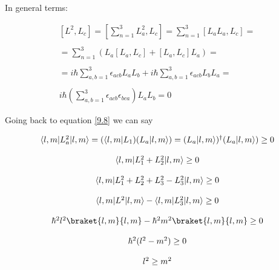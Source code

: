 In general terms:

\begin{equation}
  \begin{array}{c}
    \left[L^2,L_c\right] = \left[\sum_{n=1}^{3}L_a^2,L_c\right] = \sum_{n=1}^{3}\left[L_a L_a ,L_c\right] =
    \\

    \\
    = \sum_{n=1}^{3} \left(L_a[L_a,L_c] + [L_a,L_c] L_a\right) =
    \\

    \\
    = i\hbar \sum_{a,b=1}^{3} \epsilon_{acb} L_a L_b + i\hbar \sum_{a,b=1}^{3} \epsilon_{acb} L_b L_a =
    \\

    \\
    i\hbar \left(\sum_{a,b=1}^{3} \epsilon_{acb} \epsilon_{bca}\right) L_a L_b = 0
  \end{array}
\end{equation}


Going back to equation \ref{9.8} we can say

\begin{equation}\label{9.10}
  \begin{array}{c}
    \bra{l,m}L_a^2\ket{l,m} = (\bra{l,m}L_1)(L_a\ket{l,m}) = (L_a\ket{l,m})^\dagger(L_a\ket{l,m})  \geq 0
    \\

    \\
    \bra{l,m} L_1^2 + L_2^2 \ket{l,m} \geq 0
    \\

    \\
    \bra{l,m} L_1^2 + L_2^2 + L_3^2 - L_3^2 \ket{l,m} \geq 0
    \\

    \\
    \bra{l,m} L^2\ket{l,m} - \bra{l,m} L_3^2 \ket{l,m} \geq 0
    \\

    \\
    \hbar^2 l^2 \braket{l,m}{l,m} - \hbar^2 m^2 \braket{l,m}{l,m} \geq 0
    \\

    \\
    \hbar^2 (l^2 - m^2) \geq 0
    \\

    \\
    l^2 \geq m^2
  \end{array}
\end{equation}


